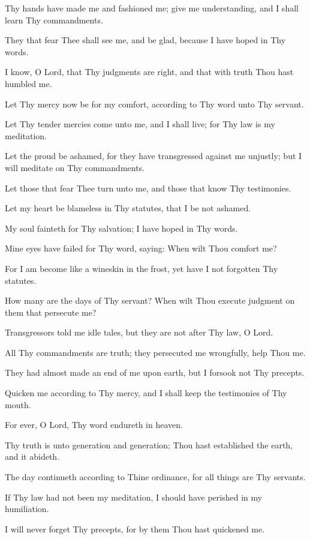 Thy hands have made me and fashioned me; give me understanding, and I shall learn Thy commandments.

They that fear Thee shall see me, and be glad, because I have hoped in Thy words.

I know, O Lord, that Thy judgments are right, and that with truth Thou hast humbled me.

Let Thy mercy now be for my comfort, according to Thy word unto Thy servant.

Let Thy tender mercies come unto me, and I shall live; for Thy law is my meditation.

Let the proud be ashamed, for they have transgressed against me unjustly; but I will meditate on Thy commandments.

Let those that fear Thee turn unto me, and those that know Thy testimonies.

Let my heart be blameless in Thy statutes, that I be not ashamed.

My soul fainteth for Thy salvation; I have hoped in Thy words.

Mine eyes have failed for Thy word, saying: When wilt Thou comfort me?

For I am become like a wineskin in the frost, yet have I not forgotten Thy statutes.

How many are the days of Thy servant? When wilt Thou execute judgment on them that persecute me?

Transgressors told me idle tales, but they are not after Thy law, O Lord.

All Thy commandments are truth; they persecuted me wrongfully, help Thou me.

They had almost made an end of me upon earth, but I forsook not Thy precepts.

Quicken me according to Thy mercy, and I shall keep the testimonies of Thy mouth.

For ever, O Lord, Thy word endureth in heaven.

Thy truth is unto generation and generation; Thou hast established the earth, and it abideth.

The day continueth according to Thine ordinance, for all things are Thy servants.

If Thy law had not been my meditation, I should have perished in my humiliation.

I will never forget Thy precepts, for by them Thou hast quickened me.
